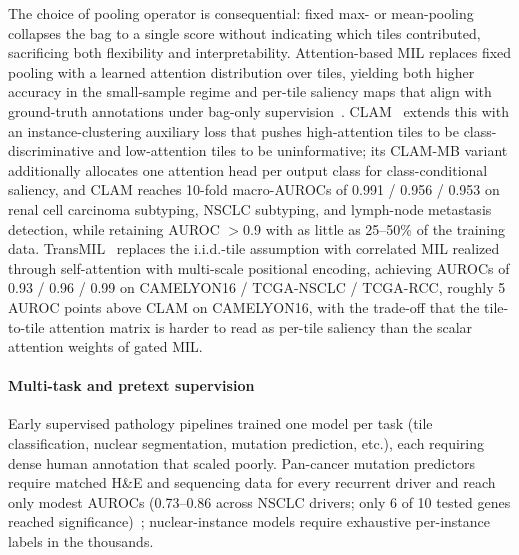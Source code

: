 The choice of pooling operator is consequential: fixed max- or mean-pooling collapses the bag to a single score without indicating which tiles contributed, sacrificing both flexibility and interpretability. Attention-based MIL replaces fixed pooling with a learned attention distribution over tiles, yielding both higher accuracy in the small-sample regime and per-tile saliency maps that align with ground-truth annotations under bag-only supervision~\cite{ilseAttentionbasedDeepMultiple2018}. 
CLAM~\cite{luDataefficientWeaklySupervised2021} extends this with an instance-clustering auxiliary loss that pushes high-attention tiles to be class-discriminative and low-attention tiles to be uninformative; its CLAM-MB variant additionally allocates one attention head per output class for class-conditional saliency, and CLAM reaches 10-fold macro-AUROCs of 0.991 / 0.956 / 0.953 on renal cell carcinoma subtyping, NSCLC subtyping, and lymph-node metastasis detection, while retaining AUROC $>$0.9 with as little as 25--50\% of the training data.
TransMIL~\cite{shaoTransMILTransformerBased2021} replaces the i.i.d.-tile assumption with correlated MIL realized through self-attention with multi-scale positional encoding, achieving AUROCs of 0.93 / 0.96 / 0.99 on CAMELYON16 / TCGA-NSCLC / TCGA-RCC, roughly 5 AUROC points above CLAM on CAMELYON16, with the trade-off that the tile-to-tile attention matrix is harder to read as per-tile saliency than the scalar attention weights of gated MIL.

\paragraph{Multi-task and pretext supervision}

Early supervised pathology pipelines trained one model per task (tile classification, nuclear segmentation, mutation prediction, etc.), each requiring dense human annotation that scaled poorly.
Pan-cancer mutation predictors require matched H\&E and sequencing data for every recurrent driver and reach only modest AUROCs (0.73--0.86 across NSCLC drivers; only 6 of 10 tested genes reached significance)~\cite{coudrayClassificationMutationPrediction2018}; nuclear-instance models require exhaustive per-instance labels in the thousands.

